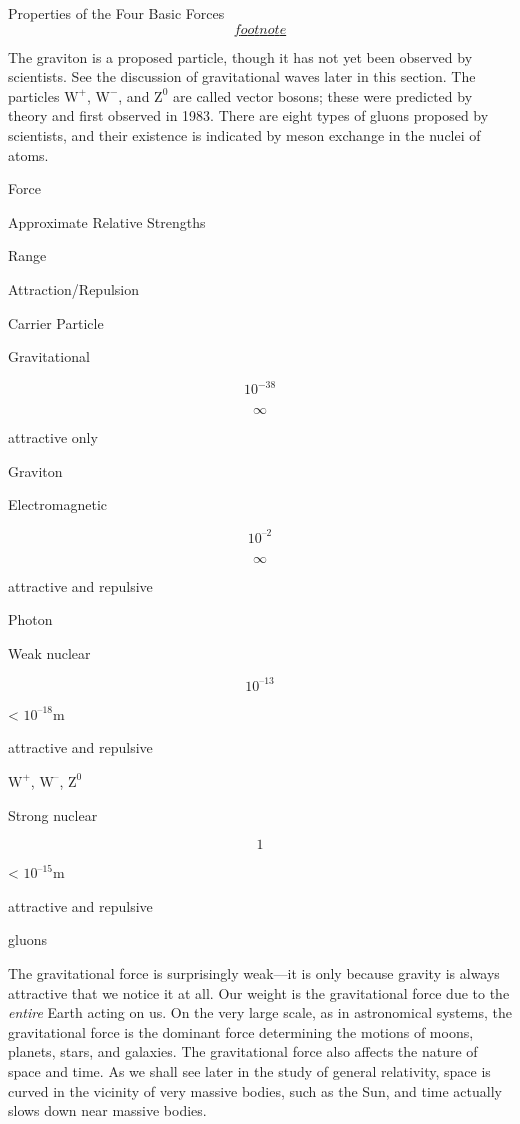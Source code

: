 \documentclass[
]{book}
\newenvironment{tinysection}{}{}
\begin{document}
\begin{tinysection}

{Properties of the Four Basic
Forces\protect\hyperlink{eip-id1997179}{\[footnote\]}}

\end{tinysection}

The graviton is a proposed particle, though it has not yet been observed
by scientists. See the discussion of gravitational waves later in this
section. The particles \(\text{W}^{+}{}\), \(\text{W}^{-}{}\), and
\(\text{Z}^{0}{}\) are called vector bosons; these were predicted by
theory and first observed in 1983. There are eight types of gluons
proposed by scientists, and their existence is indicated by meson
exchange in the nuclei of atoms.

Force

Approximate Relative Strengths

Range

Attraction/Repulsion

Carrier Particle

Gravitational

\[\text{10}^{- \text{38}}{}\]

\[\infty{}\]

attractive only

Graviton

Electromagnetic

\[\text{10}^{–2}{}\]

\[\infty{}\]

attractive and repulsive

Photon

Weak nuclear

\[\text{10}^{–\text{13}}\]

\textless{} \(10^{–18}\text{m}\)

attractive and repulsive

\(\text{W}^{+}{}\), \(\text{W}^{–}{}\), \(\text{Z}^{0}{}\)

Strong nuclear

\[1\]

\textless{} \(10^{–15}\text{m}\)

attractive and repulsive

gluons

The gravitational force is surprisingly weak---it is only because
gravity is always attractive that we notice it at all. Our weight is the
gravitational force due to the \emph{entire}
Earth acting on us. On the very large scale, as in astronomical systems,
the gravitational force is the dominant force determining the motions of
moons, planets, stars, and galaxies. The gravitational force also
affects the nature of space and time. As we shall see later in the study
of general relativity, space is curved in the vicinity of very massive
bodies, such as the Sun, and time actually slows down near massive
bodies.
\end{document}
